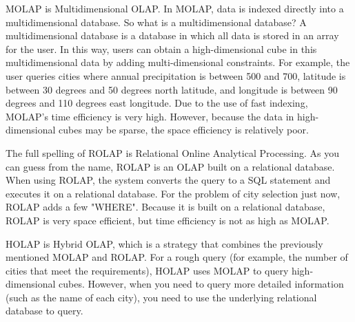 \documentclass[12pt, a4paper]{article}
\begin{document}
MOLAP is Multidimensional OLAP. In MOLAP, data is indexed directly into a multidimensional database. So what is a multidimensional database? A multidimensional database is a database in which all data is stored in an array for the user. In this way, users can obtain a high-dimensional cube in this multidimensional data by adding multi-dimensional constraints. For example, the user queries cities where annual precipitation is between 500 and 700, latitude is between 30 degrees and 50 degrees north latitude, and longitude is between 90 degrees and 110 degrees east longitude. Due to the use of fast indexing, MOLAP's time efficiency is very high. However, because the data in high-dimensional cubes may be sparse, the space efficiency is relatively poor.

The full spelling of ROLAP is Relational Online Analytical Processing. As you can guess from the name, ROLAP is an OLAP built on a relational database. When using ROLAP, the system converts the query to a SQL statement and executes it on a relational database. For the problem of city selection just now, ROLAP adds a few "WHERE". Because it is built on a relational database, ROLAP is very space efficient, but time efficiency is not as high as MOLAP.

HOLAP is Hybrid OLAP, which is a strategy that combines the previously mentioned MOLAP and ROLAP. For a rough query (for example, the number of cities that meet the requirements), HOLAP uses MOLAP to query high-dimensional cubes. However, when you need to query more detailed information (such as the name of each city), you need to use the underlying relational database to query.





\end{document}
